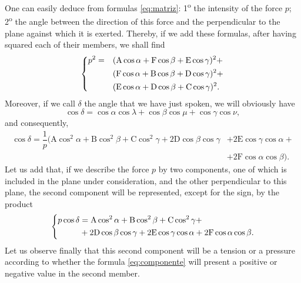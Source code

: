 \documentclass[leqno,openright,smallroyalvopaper,8pt,twoside,showtrims]{memoir}
\begin{document}
One can easily deduce from formulas \eqref{eq:matriz}:  1\textsuperscript{o} the intensity of the force $p$; 2\textsuperscript{o} the angle between the direction of this force and the perpendicular to the plane against which it is exerted. Thereby, if we add these formulas, after having squared each of their members, we shall find
\begin{align}\label{eq:p2}
\begin{dcases}
p^2 = &(\text{A}\cos\alpha+\text{F}\cos\beta+\text{E}\cos\gamma)^2+\\
&(\text{F}\cos\alpha+\text{B}\cos\beta+\text{D}\cos\gamma)^2+\\
&(\text{E}\cos\alpha+\text{D}\cos\beta+\text{C}\cos\gamma)^2.
\end{dcases}
\end{align}
Moreover, if we call $\delta$ the angle that we have just spoken, we will obviously have
\begin{equation}
\cos\delta = \cos\alpha\cos\lambda + \cos\beta\cos\mu+\cos\gamma\cos\nu,
\end{equation}
and consequently,
\begin{align}
\cos\delta = \dfrac{1}{p}(\text{A}\cos^2\alpha+\text{B}\cos^2\beta+\text{C}\cos^2\gamma+2\text{D}\cos\beta\cos\gamma &+2\text{E}\cos\gamma\cos\alpha+\\
&+2\text{F}\cos\alpha\cos\beta).\nonumber
\end{align}
Let us add that, if we describe the force $p$ by two components, one of which is included in the plane under consideration, and the other perpendicular to this plane, the second component will be represented, except for the sign, by the product
\begin{equation}\label{eq:componente}
\begin{dcases}
\begin{aligned}
p\cos\delta &= \text{A}\cos^2\alpha+\text{B}\cos^2\beta+\text{C}\cos^2\gamma+\\
&+2\text{D}\cos\beta\cos\gamma +2\text{E}\cos\gamma\cos\alpha+2\text{F}\cos\alpha\cos\beta.
\end{aligned}
\end{dcases}
\end{equation}
Let us observe finally that this second component will be a tension or a pressure according to whether the formula \eqref{eq:componente} will present a positive or negative value in the second member.
\end{document}
